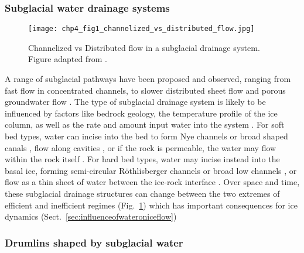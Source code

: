 \subsubsection{Subglacial water drainage systems} \label{sec:subglacialdrainagesystems}

\begin{figure}[htbp]
  \texttt{[image: chp4\_fig1\_channelized\_vs\_distributed\_flow.jpg]}
  \caption[Channelized vs distributed flow in a subglacial water system]{
    Channelized vs Distributed flow in a subglacial drainage system.
    Figure adapted from \citet{FlowersModellingwaterflow2015}.
  }
  \label{fig:4.2}
\end{figure}

A range of subglacial pathways have been proposed and observed, ranging from fast flow in concentrated channels, to slower distributed sheet flow and porous groundwater flow \citep[Fig. \ref{fig:4.2};][]{FlowersModellingwaterflow2015}.
The type of subglacial drainage system is likely to be influenced by factors like bedrock geology, the temperature profile of the ice column, as well as the rate and amount input water into the system \citep[see][for a review]{FlowersModellingwaterflow2015}.
For soft bed types, water can incise into the bed to form Nye channels \citep[Fig.~\ref{fig:4.2}c,][]{NyeWaterbedglacier1969} or broad shaped canals \citep[Fig.~\ref{fig:4.2}d,][]{NgCoupledicetill2000}, flow along cavities \citep[Fig.~\ref{fig:4.2}f,][]{LliboutryGeneralTheorySubglacial1968}, or if the rock is permeable, the water may flow within the rock itself \citep[Fig.~\ref{fig:4.2}g,][]{ShoemakerSubglacialHydrologyIce1986}.
For hard bed types, water may incise instead into the basal ice, forming semi-circular Röthlisberger channels \citep[Fig.~\ref{fig:4.2}a,][]{RothlisbergerWaterPressureIntra1972} or broad low channels \citep[Fig.~\ref{fig:4.2}b,][]{HookeSubglacialWaterPressures1990}, or flow as a thin sheet of water between the ice-rock interface \citep[Fig.~\ref{fig:4.2}e,][]{WeertmanSlidingGlaciers1957}.
Over space and time, these subglacial drainage structures can change between the two extremes of efficient and inefficient regimes (Fig.~\ref{fig:4.2}) which has important consequences for ice dynamics (Sect.~\ref{sec:influenceofwateroniceflow}) %

\subsubsection{Drumlins shaped by subglacial water}

